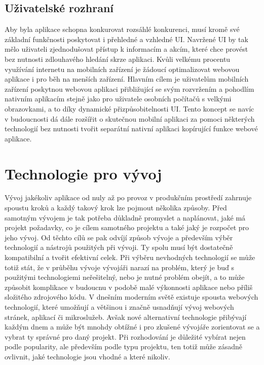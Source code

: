 	\subsection{Uživatelské rozhraní}

	Aby byla aplikace schopna konkurovat rozsáhlé konkurenci, musí kromě své základní funkčnosti poskytovat i přehledné
	a vzhledné \ac{UI}.
	Navržené \ac{UI} by tak mělo uživateli zjednodušovat přístup k informacím a akcím, které chce provést bez nutnosti
	zdlouhavého hledání skrze aplikaci.
	Kvůli velkému procentu využívání internetu na mobilních zařízení je žádoucí optimalizovat webovou aplikace i pro běh
	na menších zařízení.
	Hlavním cílem je uživatelům mobilních zařízení poskytnou webovou aplikaci přibližující se svým rozvržením a pohodlím
	nativním aplikacím stejně jako pro uživatele osobních počítačů s velkými obrazovkami, a to díky dynamické
	přizpůsobitelnosti \ac{UI}.
	Tento koncept se navíc v budoucnosti dá dále rozšířit o skutečnou mobilní aplikaci za pomoci některých technologií
	bez nutnosti tvořit separátní nativní aplikaci kopírující funkce webové aplikace.

\section{Technologie pro vývoj}

Vývoj jakékoliv aplikace od nuly až po provoz v produkčním prostředí zahrnuje spoustu kroků a každý takový krok
lze pojmout několika způsoby.
Před samotným vývojem je tak potřeba důkladně promyslet a naplánovat, jaké má projekt požadavky, co je cílem samotného projektu
a také jaký je rozpočet pro jeho vývoj.
Od těchto cílů se pak odvíjí způsob vývoje a především výběr technologií a nástrojů použitých při vývoji.
Ty spolu musí být dostatečně kompatibilní a tvořit efektivní celek.
Při výběru nevhodných technologií se může totiž stát, že v průběhu vývoje vývojáři narazí na problém, který je buď
s použitými technologiemi neřešitelný, nebo
je nutné problém obejít, a to může způsobit komplikace v budoucnu v podobě malé výkonnosti aplikace nebo příliš
složitého zdrojového kódu.
V dnešním moderním světě existuje spousta webových technologií, které umožňují a většinou i značně usnadňují vývoj
webových stránek, aplikací či mikroslužeb.
Avšak nové alternativní technologie přibývají každým dnem a může být mnohdy obtížné i pro zkušené
vývojáře zorientovat se a vybrat ty správné pro daný projekt.
Při rozhodování je důležité vybírat nejen podle popularity, ale především podle typu projektu, ten totiž může zásadně
ovlivnit, jaké technologie jsou vhodné a které nikoliv.

